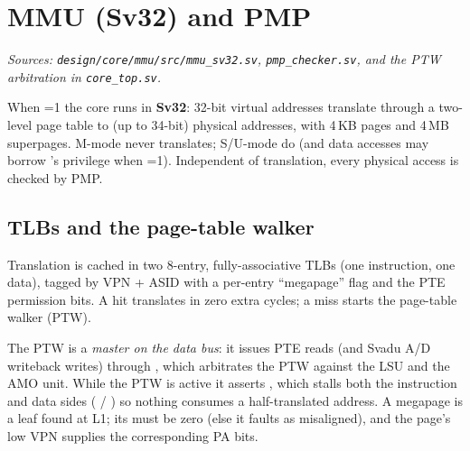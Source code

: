 \section{MMU (Sv32) and PMP}
\textit{Sources: \texttt{design/core/mmu/src/mmu\_sv32.sv},
\texttt{pmp\_checker.sv}, and the PTW arbitration in \texttt{core\_top.sv}.}

When =1 the core runs in \textbf{Sv32}: 32-bit virtual addresses
translate through a two-level page table to (up to 34-bit) physical addresses,
with 4\,KB pages and 4\,MB superpages. M-mode never translates; S/U-mode do
(and data accesses may borrow 's privilege when =1).
Independent of translation, every physical access is checked by PMP.

\subsection{TLBs and the page-table walker}
Translation is cached in two 8-entry, fully-associative TLBs (one instruction,
one data), tagged by VPN + ASID with a per-entry ``megapage'' flag and the PTE
permission bits. A hit translates in zero extra cycles; a miss starts the
page-table walker (PTW).


The PTW is a \emph{master on the data bus}: it issues PTE reads (and Svadu A/D
writeback writes) through , which arbitrates the PTW against the
LSU and the AMO unit. While the PTW is active it asserts ,
which stalls both the instruction and data sides ( /
) so nothing consumes a half-translated address. A megapage is
a leaf found at L1; its  must be zero (else it faults as
misaligned), and the page's low VPN supplies the corresponding PA bits.


